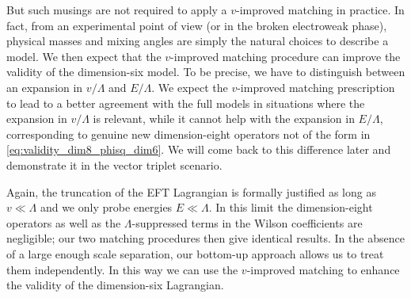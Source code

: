 \newparagraph
%
But such musings are not required to apply a $v$-improved matching in
practice. In fact, from an experimental point of view (or in the
broken electroweak phase), physical masses and mixing angles are
simply the natural choices to describe a model. We then expect that
the $v$-improved matching procedure can improve the validity of the
dimension-six model. To be precise, we have to distinguish between an
expansion in $v/\Lambda$ and $E/\Lambda$. We expect the $v$-improved
matching prescription to lead to a better agreement with the full
models in situations where the expansion in $v/\Lambda$ is relevant,
while it cannot help with the expansion in $E/\Lambda$, corresponding
to genuine new dimension-eight operators not of the form in
\autoref{eq:validity_dim8_phisq_dim6}. We will come back to this
difference later and demonstrate it in the vector triplet scenario.

Again, the truncation of the EFT Lagrangian is formally justified as
long as $v \ll \Lambda$ and we only probe energies $E \ll \Lambda$.
In this limit the dimension-eight operators as well as the
$\Lambda$-suppressed terms in the Wilson coefficients are negligible;
our two matching procedures then give identical results. In the
absence of a large enough scale separation, our bottom-up approach
allows us to treat them independently. In this way we can use the
$v$-improved matching to enhance the validity of the dimension-six
Lagrangian.




